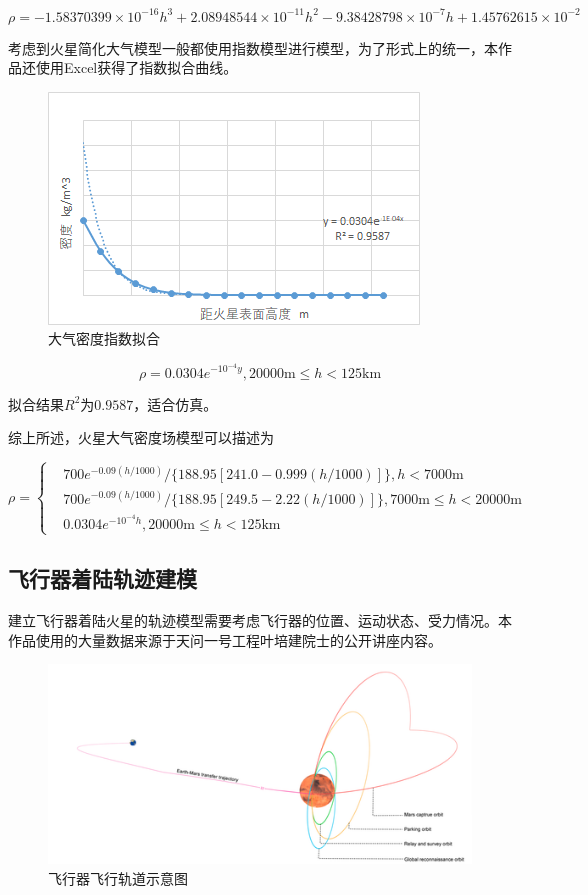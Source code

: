 \documentclass[UTF8,12pt]{ctexart}
\begin{document}
\begin{equation}
\rho=-1.58370399\times10^{-16}h^3+ 2.08948544\times10^{-11}h^2 -9.38428798\times10^{-7}h+1.45762615\times10^{-2}
\end{equation}
\newpage

考虑到火星简化大气模型一般都使用指数模型进行模型，为了形式上的统一，本作品还使用Excel获得了指数拟合曲线。
\begin{figure}[htb]
	\centering
	\includegraphics[width=0.6\linewidth]{exc密度拟合.png}
	\caption{大气密度指数拟合}
	\label{fig}	
\end{figure}
\begin{equation}
	\rho=0.0304e^{-10^{-4}y},20000\mathrm{m}\leq h<125\mathrm{km}
	\end{equation}
	
	拟合结果$R^2$为$0.9587$，适合仿真。
	
	综上所述，火星大气密度场模型可以描述为
	
	\begin{equation}
	\rho=\left\{\begin{aligned}
		&700e^{-0.09(h/1000)}/\{188.95[241.0-0.999(h/1000)]\},h<7000\mathrm{m}\\
		&700e^{-0.09(h/1000)}/\{188.95[249.5-2.22(h/1000)]\},7000\mathrm{m}\leq h<20000\mathrm{m}\\
		&0.0304e^{-10^{-4}h},20000\mathrm{m}\leq h<125\mathrm{km}
	\end{aligned}\right.
	\end{equation}
	\subsection{飞行器着陆轨迹建模}

建立飞行器着陆火星的轨迹模型需要考虑飞行器的位置、运动状态、受力情况。本作品使用的大量数据来源于天问一号工程叶培建院士的公开讲座内容。
\begin{figure}[htb]
	\centering
	\includegraphics[width=0.9\linewidth]{飞行器着陆轨迹.png}
	\caption{飞行器飞行轨道示意图}
	\label{fig}	
\end{figure}
\end{document}
